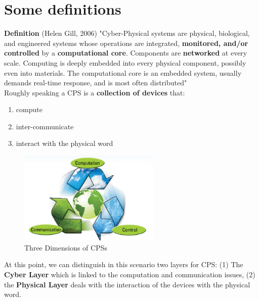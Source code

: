 \section{Some definitions}
\noindent
\textbf{Definition} (Helen Gill, 2006) "Cyber-Physical systems are physical, biological, and engineered systems whose operations are integrated, \textbf{monitored, and/or controlled} by a \textbf{computational core}. Components are \textbf{networked} at every scale. Computing is deeply embedded into every physical component, possibly even into materials. The computational core is an embedded system, usually demands real-time response, and is most often distributed"\\

\noindent Roughly speaking a CPS is a \textbf{collection of devices} that:
\begin{enumerate}
    \setlength\itemsep{-.5em}
    \item compute
    \item inter-communicate
    \item interact with the physical word
\end{enumerate}

\begin{figure}[h]
    \centering
     \includegraphics[width=0.6\textwidth]{images/CPS.png}
    \caption{Three Dimensions of CPSs}
    \label{fig:enter-label}
    \end{figure}
    
\noindent 
At this point, we can distinguish in this scenario two layers for CPS: (1) The \textbf{Cyber Layer} which is linked to the computation and communication issues, (2) the \textbf{Physical Layer} deals with the interaction of the devices with the physical word.\\
\vspace{2cm}

